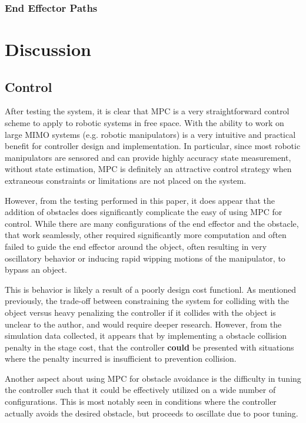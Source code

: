 \documentclass[journal]{IEEEtran}
\begin{document}
\subsubsection{End Effector Paths }

\section{Discussion}

\subsection{Control}

After testing the system, it is clear that MPC is a very straightforward control scheme to apply to robotic systems in free space. With the ability to work on large MIMO systems (e.g. robotic manipulators) is a very intuitive and practical benefit for controller design and implementation. In particular, since most robotic manipulators are sensored and can provide highly accuracy state measurement, without state estimation, MPC is definitely an attractive control strategy when extraneous constraints or limitations are not placed on the system.

However, from the testing performed in this paper, it does appear that the addition of obstacles does significantly complicate the easy of using MPC for control. While there are many configurations of the end effector and the obstacle, that work seamlessly, other required significantly more computation and often failed to guide the end effector around the object, often resulting in very oscillatory behavior or inducing rapid wipping motions of the manipulator, to bypass an object.

This is behavior is likely a result of a poorly design cost functionl. As mentioned previously, the trade-off between constraining the system for colliding with the object versus heavy penalizing the controller if it collides with the object is unclear to the author, and would require deeper research. However, from the simulation data collected, it appears that by implementing a obstacle collision penalty in the stage cost, that the controller \textbf{could} be presented with situations where the penalty incurred is insufficient to prevention collision.

Another aspect about using MPC for obstacle avoidance is the difficulty in tuning the controller such that it could be effectively utilized on a wide number of configurations. This is most notably seen in conditions where the controller actually avoids the desired obstacle, but proceeds to oscillate due to poor tuning.
\end{document}
